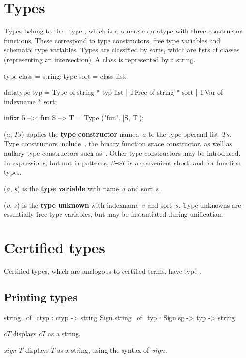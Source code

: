\section{Types}
Types belong to the \ML\ type , which is a concrete datatype with
three constructor functions.  These correspond to type constructors, free
type variables and schematic type variables.  Types are classified by sorts,
which are lists of classes (representing an intersection).  A class is
represented by a string.
\begin{ttbox}
type class = string;
type sort  = class list;

datatype typ = Type  of string * typ list
             | TFree of string * sort
             | TVar  of indexname * sort;

infixr 5 -->;
fun S --> T = Type ("fun", [S, T]);
\end{ttbox}
\begin{ttdescription}
\item[\ttindexbold{Type} ($a$, $Ts$)] 
  applies the \textbf{type constructor} named~$a$ to the type operand list~$Ts$.
  Type constructors include~, the binary function space
  constructor, as well as nullary type constructors such as~.
  Other type constructors may be introduced.  In expressions, but not in
  patterns, \hbox{\tt$S$-->$T$} is a convenient shorthand for function
  types.

\item[\ttindexbold{TFree} ($a$, $s$)] 
  is the \textbf{type variable} with name~$a$ and sort~$s$.

\item[\ttindexbold{TVar} ($v$, $s$)] 
  is the \textbf{type unknown} with indexname~$v$ and sort~$s$.
  Type unknowns are essentially free type variables, but may be
  instantiated during unification.
\end{ttdescription}


\section{Certified types}
Certified types, which are analogous to certified terms, have type
.

\subsection{Printing types}
\begin{ttbox}
     string_of_ctyp :           ctyp -> string
Sign.string_of_typ  : Sign.sg -> typ -> string
\end{ttbox}
\begin{ttdescription}
\item[\ttindexbold{string_of_ctyp} $cT$]
displays $cT$ as a string.

\item[\ttindexbold{Sign.string_of_typ} $sign$ $T$]
displays $T$ as a string, using the syntax of~$sign$.
\end{ttdescription}



